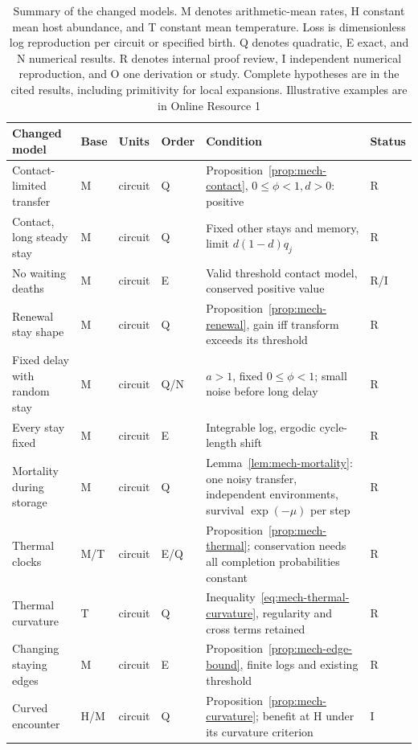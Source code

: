 \begin{table}[htbp]\centering\scriptsize
\setlength{\tabcolsep}{2pt}
\caption{Summary of the changed models. M denotes arithmetic-mean rates, H constant mean host abundance, and T constant mean temperature. Loss is dimensionless log reproduction per circuit or specified birth. Q denotes quadratic, E exact, and N numerical results. R denotes internal proof review, I independent numerical reproduction, and O one derivation or study. Complete hypotheses are in the cited results, including primitivity for local expansions. Illustrative examples are in Online Resource 1}\label{tab:mech-summary}
\begin{tabular*}{\textwidth}{@{\extracolsep{\fill}}p{}p{}p{}p{}p{}p{}@{}}\toprule
Changed model & Base & Units & Order & Condition & Status\\\midrule
Contact-limited transfer & M & circuit & Q & Proposition~\ref{prop:mech-contact}, \(0\leq\phi<1,d>0\): positive & R\\
Contact, long steady stay & M & circuit & Q & Fixed other stays and memory, limit \(d(1-d)q_j\) & R\\
No waiting deaths & M & circuit & E & Valid threshold contact model, conserved positive value & R/I\\
Renewal stay shape & M & circuit & Q & Proposition~\ref{prop:mech-renewal}, gain iff transform exceeds its threshold & R\\
Fixed delay with random stay & M & circuit & Q/N & \(a>1\), fixed \(0\leq\phi<1\); small noise before long delay & R\\
Every stay fixed & M & circuit & E & Integrable log, ergodic cycle-length shift & R\\
Mortality during storage & M & circuit & Q & Lemma~\ref{lem:mech-mortality}: one noisy transfer, independent environments, survival \(\exp(-\mu)\) per step & R\\
Thermal clocks & M/T & circuit & E/Q & Proposition~\ref{prop:mech-thermal}; conservation needs all completion probabilities constant & R\\
Thermal curvature & T & circuit & Q & Inequality~\eqref{eq:mech-thermal-curvature}, regularity and cross terms retained & R\\
Changing staying edges & M & circuit & E & Proposition~\ref{prop:mech-edge-bound}, finite logs and existing threshold & R\\
Curved encounter & H/M & circuit & Q & Proposition~\ref{prop:mech-curvature}; benefit at H under its curvature criterion & I\\

\end{tabular*}
\end{table}
